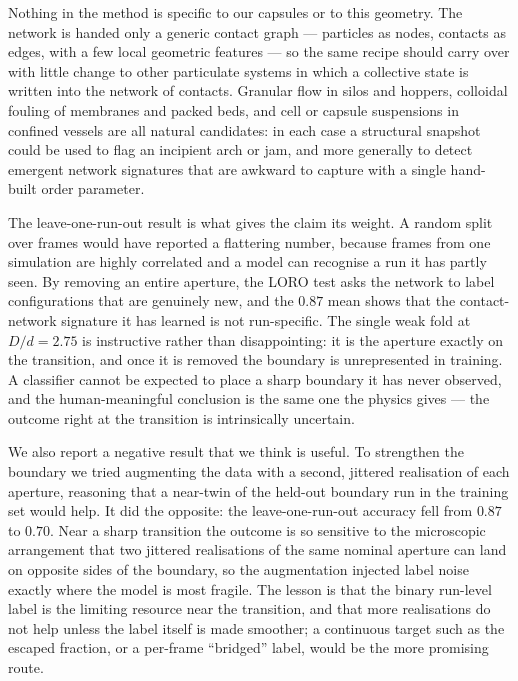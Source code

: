 \documentclass[11pt,a4paper]{article}
\begin{document}
Nothing in the method is specific to our capsules or to this geometry.
The network is handed only a generic contact graph --- particles as
nodes, contacts as edges, with a few local geometric features --- so the
same recipe should carry over with little change to other particulate
systems in which a collective state is written into the network of
contacts. Granular flow in silos and hoppers, colloidal fouling of
membranes and packed beds, and cell or capsule suspensions in confined
vessels are all natural candidates: in each case a structural snapshot
could be used to flag an incipient arch or jam, and more generally to
detect emergent network signatures that are awkward to capture with a
single hand-built order parameter.

The leave-one-run-out result is what gives the claim its weight. A
random split over frames would have reported a flattering number,
because frames from one simulation are highly correlated and a model can
recognise a run it has partly seen. By removing an entire aperture, the
LORO test asks the network to label configurations that are genuinely
new, and the $0.87$ mean shows that the contact-network signature it has
learned is not run-specific. The single weak fold at $D/d=2.75$ is
instructive rather than disappointing: it is the aperture exactly on the
transition, and once it is removed the boundary is unrepresented in
training. A classifier cannot be expected to place a sharp boundary it
has never observed, and the human-meaningful conclusion is the same one
the physics gives --- the outcome right at the transition is intrinsically
uncertain.

We also report a negative result that we think is useful. To strengthen
the boundary we tried augmenting the data with a second, jittered
realisation of each aperture, reasoning that a near-twin of the held-out
boundary run in the training set would help. It did the opposite: the
leave-one-run-out accuracy fell from $0.87$ to $0.70$. Near a sharp
transition the outcome is so sensitive to the microscopic arrangement
that two jittered realisations of the same nominal aperture can land on
opposite sides of the boundary, so the augmentation injected label noise
exactly where the model is most fragile. The lesson is that the binary
run-level label is the limiting resource near the transition, and that
more realisations do not help unless the label itself is made smoother;
a continuous target such as the escaped fraction, or a per-frame
``bridged'' label, would be the more promising route.
\end{document}
